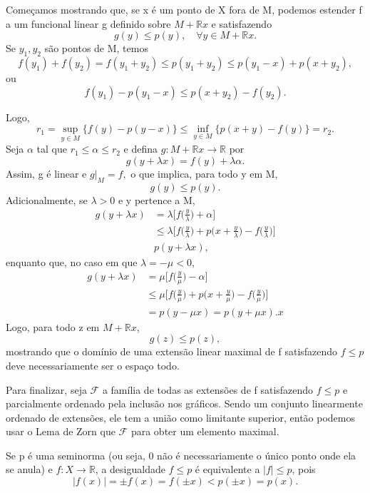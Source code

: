 \documentclass[../functional_analysis.tex]{subfiles}
\begin{document}
\begin{proof*}
  Começamos mostrando que, se x é um ponto de X fora de M, podemos estender f a um funcional linear g definido sobre \(M+\mathbb{R}x\) e satisfazendo 
    \[
      g(y)\leq p(y),\quad \forall y\in M + \mathbb{R}x.
    \]
    Se \(y_1, y_2\) são pontos de M, temos 
      \[
        f(y_1)+f(y_2) = f(y_1+y_2)\leq p(y_1+y_2)\leq p(y_1-x)+p(x+y_2),
      \]
      ou 
        \[
          f(y_1)-p(y_1-x)\leq p(x+y_2)-f(y_2).
        \]

        Logo, 
          \[
            r_1=\sup_{y\in M}\{f(y)-p(y-x)\}\leq \inf_{y\in M}\{p(x+y)-f(y)\}=r_2.
          \]
          Seja \(\alpha \) tal que \(r_1\leq \alpha \leq r_2\) e defina \(g:M+\mathbb{R}x\rightarrow \mathbb{R}\) por 
            \[
              g(y+\lambda x)=f(y)+\lambda \alpha .
            \]
            Assim, g é linear e \(g|_{M}=f,\) o que implica, para todo y em M, 
              \[
                g(y)\leq p(y).
              \]
              Adicionalmente, se \(\lambda > 0\) e y pertence a M,  
             \begin{align*}
               g(y+\lambda x)&=\lambda \biggl[f \biggl(\frac{y}{\lambda }\biggr)+\alpha \biggr]\\ 
                             &\leq \lambda \biggl[f\biggl(\frac{y}{\lambda }\biggr) + p \biggl(x + \frac{y}{\lambda }\biggr) - f \biggl(\frac{y}{\lambda }\biggr)\biggr]\\ 
                             & p(y+\lambda x),
             \end{align*}
             enquanto que, no caso em que \(\lambda =-\mu <0\), 
              \begin{align*}
               g(y+\lambda x)&=\mu \biggl[f \biggl(\frac{y}{\mu }\biggr)-\alpha \biggr]\\ 
                             &\leq \mu \biggl[f\biggl(\frac{y}{\mu }\biggr) + p \biggl(x + \frac{y}{\mu }\biggr) - f \biggl(\frac{y}{\mu }\biggr)\biggr]\\ 
                             & = p(y - \mu x)= p(y+\mu x).
x            \end{align*}
             Logo, para todo z em \(M + \mathbb{R}x\), 
               \[
                 g(z)\leq p(z),
               \]
               mostrando que o domínio de uma extensão linear maximal de f satisfazendo \(f\leq p\) deve necessariamente ser o espaço todo.

                Para finalizar, seja \(\mathcal{F}\) a família de todas as extensões de f satisfazendo \(f\leq p\) e parcialmente ordenado pela inclusão nos gráficos. Sendo um conjunto linearmente ordenado de extensões, ele tem a união como limitante superior, então podemos usar o Lema de Zorn que \(\mathcal{F}\) para obter um elemento maximal. \qedsymbol
\end{proof*}
  Se p é uma seminorma (ou seja, 0 não é necessariamente o único ponto onde ela se anula) e \(f:X\rightarrow \mathbb{R}\), a desigualdade \(f\leq p\) é equivalente a \(|f|\leq p\), pois 
    \[
      |f(x)| = \pm f(x)= f(\pm x)< p(\pm x) = p(x).
    \]
\end{document}
